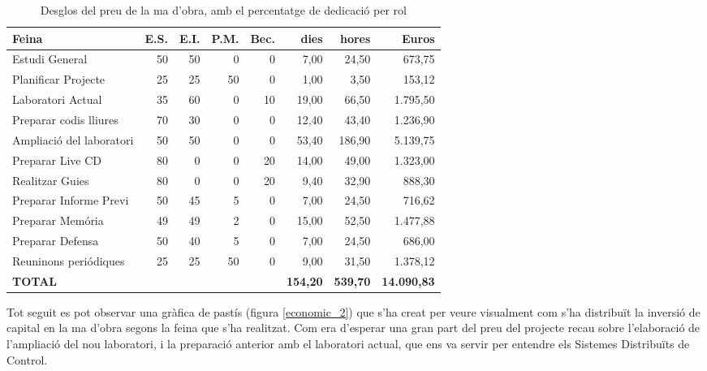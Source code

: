 \begin{table}[ht!]
	\begin{tabular}{l | r r r r | r | r | r}
\textbf{Feina} &\textbf{E.S.}	&\textbf{E.I.}	&\textbf{P.M.}	&\textbf{Bec.}	&\textbf{dies}	&\textbf{hores}	&\textbf{Euros}\\
\hline
\hline
Estudi General	&50	&50	&0	&0	&7,00	&24,50	&673,75\\
\hline
Planificar Projecte	&25	&25	&50	&0	&1,00	&3,50	&153,12\\
\hline
Laboratori Actual	&35	&60	&0	&10	&19,00	&66,50	&1.795,50\\
\hline
Preparar codis lliures	&70	&30	&0	&0	&12,40	&43,40	&1.236,90\\
\hline
Ampliació del laboratori	&50	&50	&0	&0	&53,40	&186,90	&5.139,75\\
\hline
Preparar Live CD	&80	&0	&0	&20	&14,00	&49,00	&1.323,00\\
\hline
Realitzar Guies	&80	&0	&0	&20	&9,40	&32,90	&888,30\\
\hline
Preparar Informe Previ	&50	&45	&5	&0	&7,00	&24,50	&716,62\\
\hline
Preparar Memória	&49	&49	&2	&0	&15,00	&52,50	&1.477,88\\
\hline
Preparar Defensa	&50	&40	&5	&0	&7,00	&24,50	&686,00\\
\hline
Reuninons periódiques	&25	&25	&50	&0	&9,00	&31,50	&1.378,12\\
\hline
\hline
\textbf{TOTAL}	&	&	&	&	&\textbf{154,20}	&\textbf{539,70}	&\textbf{14.090,83}\\
\hline
	\end{tabular}
	\caption[Desglos del preu de la ma d'obra]{Desglos del preu de la ma d'obra, amb el percentatge de dedicació per rol}
	\label{tab:costs}
\end{table}

Tot seguit es pot observar una gràfica de pastís (figura \ref{economic_2}) que s'ha creat per veure visualment com s'ha distribuït la inversió de capital en la ma d'obra segons la feina que s'ha realitzat. Com era d'esperar una gran part del preu del projecte recau sobre l'elaboració de l'ampliació del nou laboratori, i la preparació anterior amb el laboratori actual, que ens va servir per entendre els Sistemes Distribuïts de Control.





